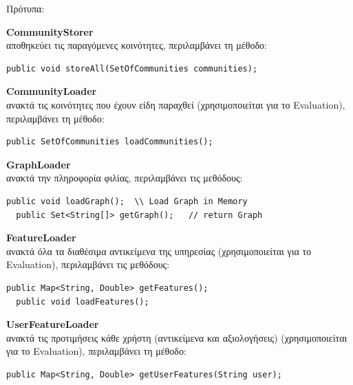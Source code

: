 Πρότυπα:
\begin{description}
\item \textbf{CommunityStorer}   \hfill \\
  αποθηκεύει τις παραγόμενες κοινότητες, περιλαμβάνει τη μέθοδο:
\begin{lstlisting}[frame=single]
  public void storeAll(SetOfCommunities communities);
\end{lstlisting} 
\item \textbf{CommunityLoader}   \hfill \\
  ανακτά τις κοινότητες που έχουν είδη παραχθεί (χρησιμοποιείται για το Evaluation), περιλαμβάνει τη μέθοδο:
\begin{lstlisting}[frame=single]
  public SetOfCommunities loadCommunities();
\end{lstlisting} 
\item \textbf{GraphLoader}   \hfill \\
  ανακτά την πληροφορία φιλίας, περιλαμβάνει τις μεθόδους:
\begin{lstlisting}[frame=single]
  public void loadGraph();  \\ Load Graph in Memory
  public Set<String[]> getGraph();   // return Graph
\end{lstlisting} 
\item \textbf{FeatureLoader}   \hfill \\
  ανακτά όλα τα διαθέσιμα αντικείμενα της υπηρεσίας (χρησιμοποιείται για το Evaluation),
   περιλαμβάνει τις μεθόδους:
\begin{lstlisting}[frame=single]
  public Map<String, Double> getFeatures();
  public void loadFeatures();
\end{lstlisting} 
\item \textbf{UserFeatureLoader}   \hfill \\
  ανακτά τις προτιμήσεις κάθε χρήστη (αντικείμενα και αξιολογήσεις) (χρησιμοποιείται για το Evaluation), περιλαμβάνει τη μέθοδο:
\begin{lstlisting}[frame=single]
  public Map<String, Double> getUserFeatures(String user);
\end{lstlisting} 
\end{description}


